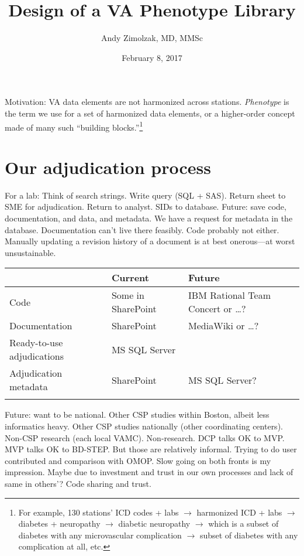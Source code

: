 \documentclass{tufte-handout}
\title{Design of a VA Phenotype Library}
\author{Andy Zimolzak, MD, MMSc}
\date{February 8, 2017}
\begin{document}
\maketitle

Motivation: VA data elements are not harmonized across stations.
\emph{Phenotype} is the term we use for a set of harmonized data
elements, or a higher-order concept made of many such ``building
blocks.''\footnote{For example, 130 stations' ICD codes + labs $\to$
  harmonized ICD + labs $\to$ diabetes + neuropathy $\to$ diabetic
  neuropathy $\to$ which is a subset of diabetes with any
  microvascular complication $\to$ subset of diabetes with any
  complication at all, etc.}

\section{Our adjudication process}

For a lab: Think of search strings. Write query (SQL + SAS). Return
sheet to SME for adjudication. Return to analyst. SIDs to database.
Future: save code, documentation, and data, and metadata. We have a
request for metadata in the database. Documentation can't live there
feasibly. Code probably not either. Manually updating a revision
history of a document is at best onerous---at worst unsustainable.

\noindent \begin{tabular}{lll}
\\
\hline
 & Current & Future\\
\hline
Code & Some in SharePoint & IBM Rational Team Concert or \ldots{}?\\
Documentation & SharePoint & MediaWiki or \ldots{}?\\
Ready-to-use adjudications & MS SQL Server\\
Adjudication metadata & SharePoint & MS SQL Server?\\
\hline
\\
\end{tabular}

Future: want to be national.  Other CSP studies within Boston, albeit
less informatics heavy. Other CSP studies nationally (other
coordinating centers). Non-CSP research (each local VAMC).
Non-research. DCP talks OK to MVP. MVP talks OK to BD-STEP. But those
are relatively informal. Trying to do user contributed and comparison
with OMOP. Slow going on both fronts is my impression. Maybe due to
investment and trust in our own processes and lack of same in others'?
Code sharing and trust.
\end{document}
